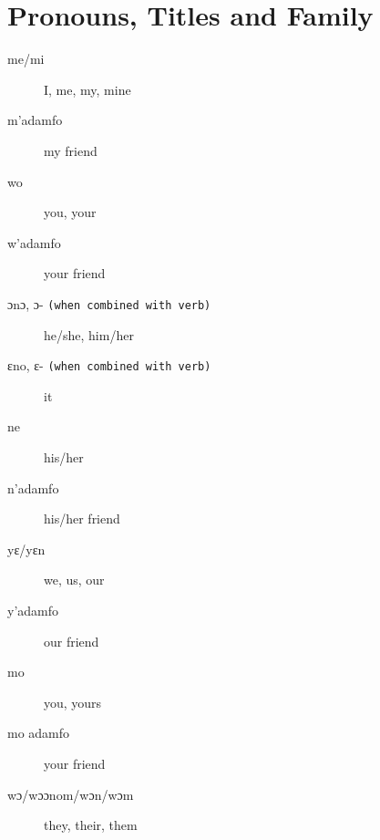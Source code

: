 \documentclass[%
 fontsize=11pt,%
 a5paper,pagesize,
 paper=a5,%
 DIV=9,%
 parskip=half*,%
 twoside=true,
 pointlessnumbers
]{scrbook}%
\begin{document}
\chapter{Pronouns, Titles and Family}

\begin{description}
  \item[me/mi] I, me, my, mine
  \item[m'adamfo] my friend
  \item[wo] you, your
  \item[w'adamfo] your friend
  \item[ɔnɔ, ɔ- \texttt{(when combined with verb)}] he/she, him/her
  \item[ɛno, ɛ- \texttt{(when combined with verb)}] it
  \item[ne] his/her
  \item[n'adamfo] his/her friend
  \item[yɛ/yɛn] we, us, our
  \item[y'adamfo] our friend
  \item[mo] you, yours
  \item[mo adamfo] your friend
  \item[wɔ/wɔɔnom/wɔn/wɔm] they, their, them
\end{description}
\end{document}
